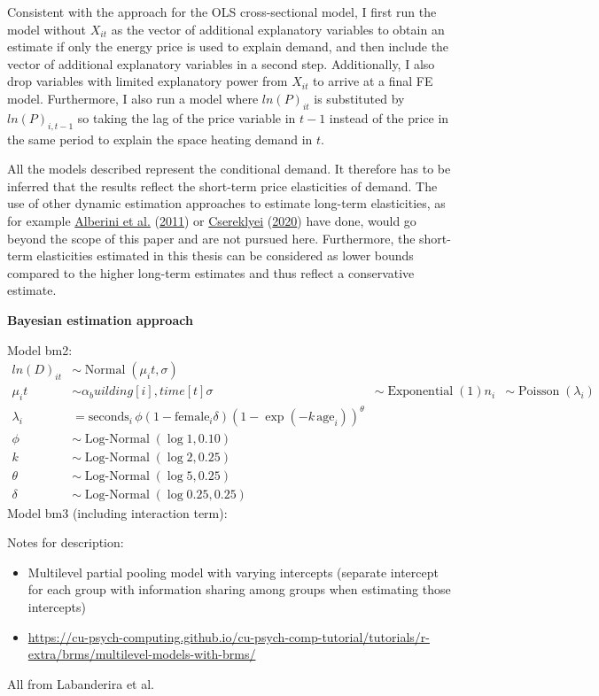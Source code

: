 \documentclass[12pt,twoside]{reedthesis}
\begin{document}
Consistent with the approach for the OLS cross-sectional model, I first run the model without \(X_{it}\) as the vector of additional explanatory variables to obtain an estimate if only the energy price is used to explain demand, and then include the vector of additional explanatory variables in a second step. Additionally, I also drop variables with limited explanatory power from \(X_{it}\) to arrive at a final FE model. Furthermore, I also run a model where \(ln(P)_{it}\) is substituted by \(ln(P)_{i,t-1}\) so taking the lag of the price variable in \(t-1\) instead of the price in the same period to explain the space heating demand in \(t\).

All the models described represent the conditional demand. It therefore has to be inferred that the results reflect the short-term price elasticities of demand. The use of other dynamic estimation approaches to estimate long-term elasticities, as for example \protect\hyperlink{ref-alberini_etal11}{Alberini et al.} (\protect\hyperlink{ref-alberini_etal11}{2011}) or \protect\hyperlink{ref-csereklyei20}{Csereklyei} (\protect\hyperlink{ref-csereklyei20}{2020}) have done, would go beyond the scope of this paper and are not pursued here. Furthermore, the short-term elasticities estimated in this thesis can be considered as lower bounds compared to the higher long-term estimates and thus reflect a conservative estimate.

\textbf{Bayesian estimation approach}

Model bm2:
\begin{align*}
ln(D)_{it} & \sim \operatorname{Normal}(\mu_it, \sigma) \\
\mu_it & \sim \alpha_building[i], time [t]
\sigma & \sim \operatorname{Exponential}(1)

n_i & \sim \operatorname{Poisson}(\lambda_i) \\
\lambda_i & = \text{seconds}_i \, \phi (1 - \text{female}_i \delta ) (1 - \exp(-k \,\text{age}_i))^\theta \\
\phi   & \sim \operatorname{Log-Normal}(\log 1, 0.10) \\
k      & \sim \operatorname{Log-Normal}(\log 2, 0.25) \\
\theta & \sim \operatorname{Log-Normal}(\log 5, 0.25) \\
\delta & \sim \operatorname{Log-Normal}(\log 0.25, 0.25)
\end{align*}
Model bm3 (including interaction term):

Notes for description:
\begin{itemize}
\item
  Multilevel partial pooling model with varying intercepts (separate intercept for each group with information sharing among groups when estimating those intercepts)
\item
  \url{https://cu-psych-computing.github.io/cu-psych-comp-tutorial/tutorials/r-extra/brms/multilevel-models-with-brms/}
\end{itemize}
All from Labanderira et al.
\end{document}
